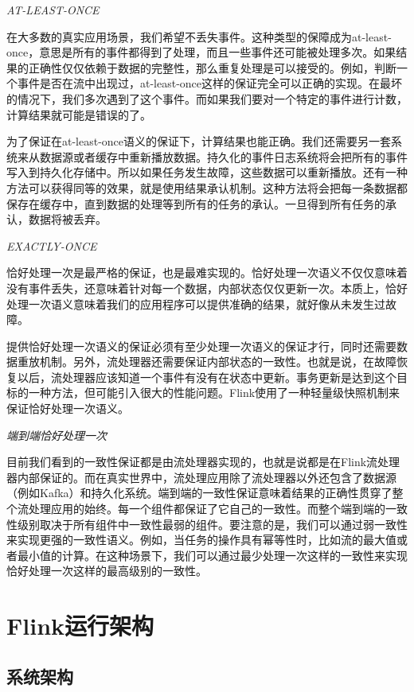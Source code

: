 \documentclass[cn,11pt,chinese]{elegantbook}
\begin{document}
\emph{AT-LEAST-ONCE}

在大多数的真实应用场景，我们希望不丢失事件。这种类型的保障成为at-least-once，意思是所有的事件都得到了处理，而且一些事件还可能被处理多次。如果结果的正确性仅仅依赖于数据的完整性，那么重复处理是可以接受的。例如，判断一个事件是否在流中出现过，at-least-once这样的保证完全可以正确的实现。在最坏的情况下，我们多次遇到了这个事件。而如果我们要对一个特定的事件进行计数，计算结果就可能是错误的了。

为了保证在at-least-once语义的保证下，计算结果也能正确。我们还需要另一套系统来从数据源或者缓存中重新播放数据。持久化的事件日志系统将会把所有的事件写入到持久化存储中。所以如果任务发生故障，这些数据可以重新播放。还有一种方法可以获得同等的效果，就是使用结果承认机制。这种方法将会把每一条数据都保存在缓存中，直到数据的处理等到所有的任务的承认。一旦得到所有任务的承认，数据将被丢弃。

\emph{EXACTLY-ONCE}

恰好处理一次是最严格的保证，也是最难实现的。恰好处理一次语义不仅仅意味着没有事件丢失，还意味着针对每一个数据，内部状态仅仅更新一次。本质上，恰好处理一次语义意味着我们的应用程序可以提供准确的结果，就好像从未发生过故障。

提供恰好处理一次语义的保证必须有至少处理一次语义的保证才行，同时还需要数据重放机制。另外，流处理器还需要保证内部状态的一致性。也就是说，在故障恢复以后，流处理器应该知道一个事件有没有在状态中更新。事务更新是达到这个目标的一种方法，但可能引入很大的性能问题。Flink使用了一种轻量级快照机制来保证恰好处理一次语义。

\emph{端到端恰好处理一次}

目前我们看到的一致性保证都是由流处理器实现的，也就是说都是在Flink流处理器内部保证的。而在真实世界中，流处理应用除了流处理器以外还包含了数据源（例如Kafka）和持久化系统。端到端的一致性保证意味着结果的正确性贯穿了整个流处理应用的始终。每一个组件都保证了它自己的一致性。而整个端到端的一致性级别取决于所有组件中一致性最弱的组件。要注意的是，我们可以通过弱一致性来实现更强的一致性语义。例如，当任务的操作具有幂等性时，比如流的最大值或者最小值的计算。在这种场景下，我们可以通过最少处理一次这样的一致性来实现恰好处理一次这样的最高级别的一致性。

\hypertarget{flinkux8fd0ux884cux67b6ux6784}{%
\chapter{Flink运行架构}\label{flinkux8fd0ux884cux67b6ux6784}}

\hypertarget{ux7cfbux7edfux67b6ux6784}{%
\section{系统架构}\label{ux7cfbux7edfux67b6ux6784}}
\end{document}
